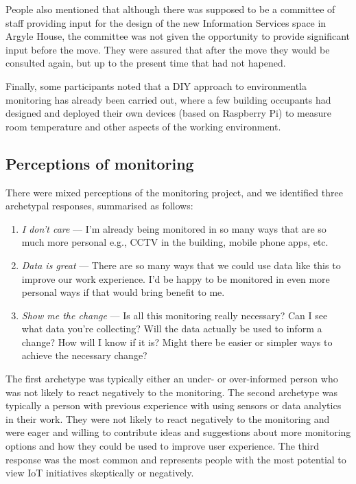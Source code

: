 People also mentioned that although there was supposed to be a
committee of staff providing input for the design of the new
Information Services space in Argyle House, the committee was not
given the opportunity to provide significant input before the
move. They were assured that after the move they would be consulted
again, but up to the present time that had not hapened.

Finally, some participants noted that a DIY approach to environmentla
monitoring has already been carried out, where a few building
occupants had designed and deployed
their own devices (based on Raspberry Pi) to measure room temperature and
other aspects of the working environment. 

\subsection{Perceptions of monitoring}
\label{sec:perc-monit}

There were mixed perceptions of the monitoring project, and we
identified three archetypal responses, summarised as follows: 

\begin{enumerate}
\item \textit{I don't care} --- I'm already being monitored in so many ways
  that are so much more personal e.g., CCTV in the building, mobile
  phone apps, etc. 
\item \textit{Data is great} --- There are so many ways that we could use
  data like this to improve our work experience. I'd
  be happy to be monitored in even more personal ways if that would
  bring benefit to me. 
\item \textit{Show me the change} --- Is all this monitoring really necessary?
  Can I see what data you’re collecting? Will the data actually be
  used to inform a change? How will I know if it is? Might there be
  easier or simpler ways to achieve the necessary change? 
\end{enumerate}

The first archetype was typically either an under- or over-informed
person who was not likely to react negatively to the monitoring. The
second archetype was typically a person with previous experience with
using sensors or data analytics in their work. They were not likely to
react negatively to the monitoring and were eager and willing to
contribute ideas and suggestions about more monitoring options and how
they could be used to improve user experience. The third response was
the most common and represents people with the most potential to view
IoT initiatives skeptically or negatively. 

